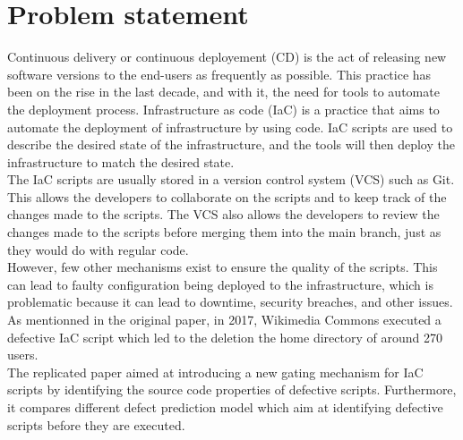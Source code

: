 
\section{Problem statement}
Continuous delivery or continuous deployement (CD) is the act of releasing new software versions to the end-users as frequently as possible. This practice has been on the rise in the last decade, and with it, the need for tools to automate the deployment process. Infrastructure as code (IaC) is a practice that aims to automate the deployment of infrastructure by using code. IaC scripts are used to describe the desired state of the infrastructure, and the tools will then deploy the infrastructure to match the desired state. \\
The IaC scripts are usually stored in a version control system (VCS) such as Git. This allows the developers to collaborate on the scripts and to keep track of the changes made to the scripts. The VCS also allows the developers to review the changes made to the scripts before merging them into the main branch, just as they would do with regular code. \\
However, few other mechanisms exist to ensure the quality of the scripts. This can lead to faulty configuration being deployed to the infrastructure, which is problematic because it can lead to downtime, security breaches, and other issues. As mentionned in the original paper, in 2017, Wikimedia Commons executed a defective IaC script which led to the deletion the home directory of around 270 users. \\
The replicated paper aimed at introducing a new gating mechanism for IaC scripts by identifying the source code properties of defective scripts. Furthermore, it compares different defect prediction model which aim at identifying defective scripts before they are executed. \\


